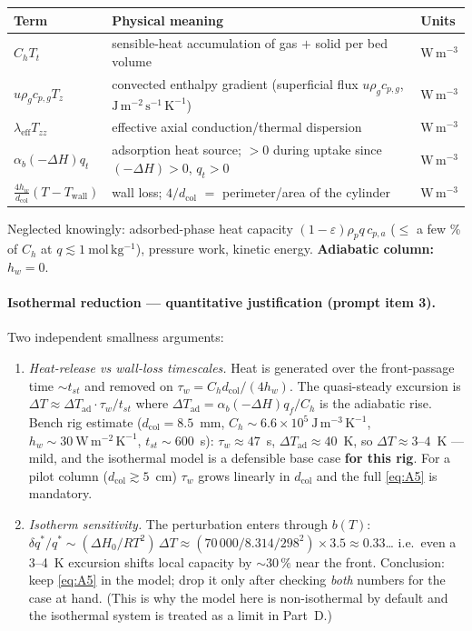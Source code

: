 \documentclass[11pt]{article}
\theoremstyle{remark}
\newcommand{\dcol}{d_{\mathrm{col}}}
\newcommand{\Twall}{T_{\mathrm{wall}}}
\newcommand{\lameff}{\lambda_{\mathrm{eff}}}
\newcommand{\DTad}{\Delta T_{\mathrm{ad}}}
\begin{document}
\begin{center}
\begin{tabular}{@{}l p{8.5cm} l@{}}
\toprule
Term & Physical meaning & Units \\
\midrule
$C_h T_t$ & sensible-heat accumulation of gas $+$ solid per bed volume & $\mathrm{W\,m^{-3}}$ \\
$u\rho_g c_{p,g} T_z$ & convected enthalpy gradient (superficial flux $u\rho_g c_{p,g}$,
  $\mathrm{J\,m^{-2}\,s^{-1}\,K^{-1}}$) & $\mathrm{W\,m^{-3}}$ \\
$\lameff T_{zz}$ & effective axial conduction/thermal dispersion & $\mathrm{W\,m^{-3}}$ \\
$\alpha_b(-\Delta H) q_t$ & adsorption heat source; $>0$ during uptake since
  $(-\Delta H)>0$, $q_t>0$ & $\mathrm{W\,m^{-3}}$ \\
$\tfrac{4h_w}{\dcol}(T-\Twall)$ & wall loss; $4/\dcol$ $=$ perimeter/area of the
  cylinder & $\mathrm{W\,m^{-3}}$ \\
\bottomrule
\end{tabular}
\end{center}

Neglected knowingly: adsorbed-phase heat capacity
$(1-\varepsilon)\rho_p q\,c_{p,a}$ ($\le$ a few \% of $C_h$ at
$q\lesssim1~\mathrm{mol\,kg^{-1}}$), pressure work, kinetic energy.
\textbf{Adiabatic column:} $h_w=0$.

\paragraph{Isothermal reduction --- quantitative justification (prompt item 3).}
Two independent smallness arguments:
\begin{enumerate}
\item \emph{Heat-release vs wall-loss timescales.} Heat is generated over the
front-passage time ${\sim}t_{st}$ and removed on $\tau_w = C_h \dcol/(4h_w)$.
The quasi-steady excursion is $\Delta T \approx \DTad\cdot \tau_w/t_{st}$ where
$\DTad=\alpha_b(-\Delta H)q_f/C_h$ is the adiabatic rise. Bench rig estimate
($\dcol=8.5$~mm, $C_h\sim6.6\times10^{5}~\mathrm{J\,m^{-3}\,K^{-1}}$,
$h_w\sim30~\mathrm{W\,m^{-2}\,K^{-1}}$, $t_{st}\sim600$~s):
$\tau_w\approx47$~s, $\DTad\approx40$~K, so $\Delta T\approx3$--$4$~K --- mild,
and the isothermal model is a defensible base case \textbf{for this rig}. For a
pilot column ($\dcol\gtrsim5$~cm) $\tau_w$ grows linearly in $\dcol$ and the
full \eqref{eq:A5} is mandatory.
\item \emph{Isotherm sensitivity.} The perturbation enters through $b(T)$:
$\delta q^*/q^* \sim (\Delta H_0/RT^2)\,\Delta T
\approx (70\,000/8.314/298^2)\times 3.5 \approx 0.33$\ldots{} i.e.\ even a
3--4~K excursion shifts local capacity by ${\sim}30\,\%$ near the front.
Conclusion: keep \eqref{eq:A5} in the model; drop it only after checking
\emph{both} numbers for the case at hand. (This is why the model here is
non-isothermal by default and the isothermal system is treated as a limit in
Part~D.)
\end{enumerate}
\end{document}
